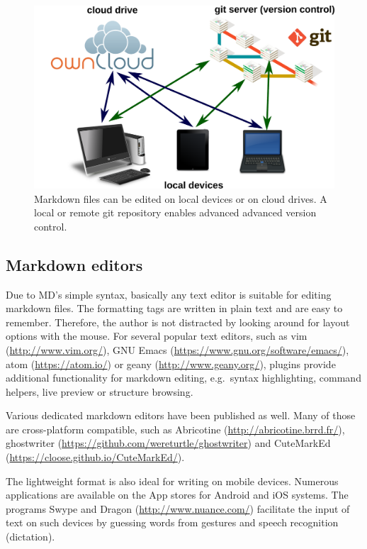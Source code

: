 \documentclass[10pt,fleqn]{wlpeerj}
\begin{document}
\begin{figure}[htbp]
\centering
\includegraphics{Fig4.png}
\caption{Markdown files can be edited on local devices or on cloud
drives. A local or remote git repository enables advanced advanced
version control.}
\end{figure}

\subsection{Markdown editors}\label{markdown-editors}

Due to MD's simple syntax, basically any text editor is suitable for
editing markdown files. The formatting tags are written in plain text
and are easy to remember. Therefore, the author is not distracted by
looking around for layout options with the mouse. For several popular
text editors, such as vim (\url{http://www.vim.org/}), GNU Emacs
(\url{https://www.gnu.org/software/emacs/}), atom
(\url{https://atom.io/}) or geany (\url{http://www.geany.org/}), plugins
provide additional functionality for markdown editing, e.g.~syntax
highlighting, command helpers, live preview or structure browsing.

Various dedicated markdown editors have been published as well. Many of
those are cross-platform compatible, such as Abricotine
(\url{http://abricotine.brrd.fr/}), ghostwriter
(\url{https://github.com/wereturtle/ghostwriter}) and CuteMarkEd
(\url{https://cloose.github.io/CuteMarkEd/}).

The lightweight format is also ideal for writing on mobile devices.
Numerous applications are available on the App stores for Android and
iOS systems. The programs Swype and Dragon
(\url{http://www.nuance.com/}) facilitate the input of text on such
devices by guessing words from gestures and speech recognition
(dictation).
\end{document}
